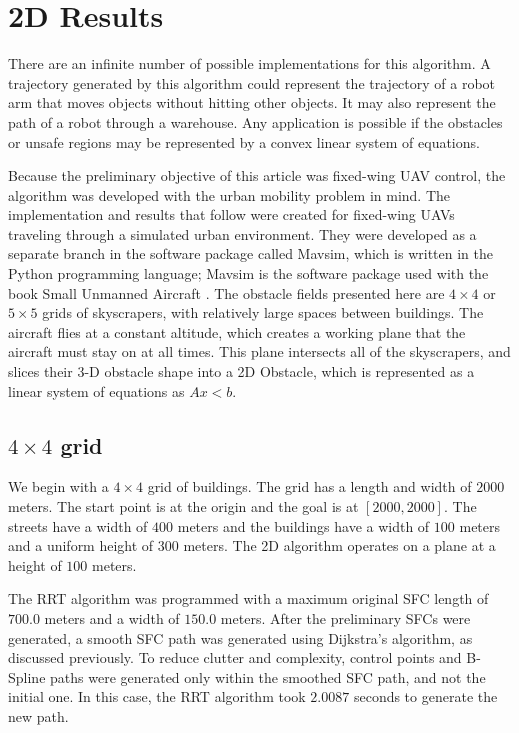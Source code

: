 \section{2D Results}

There are an infinite number of possible implementations for this algorithm. 
A trajectory generated by this algorithm could represent the trajectory of a robot arm that moves objects without hitting other objects. 
It may also represent the path of a robot through a warehouse. 
Any application is possible if the obstacles or unsafe regions may be represented by a convex linear system of equations. 

Because the preliminary objective of this article was fixed-wing UAV control, the algorithm was developed with the urban mobility problem in mind. The implementation and results that follow were created for fixed-wing UAVs traveling through a simulated urban environment. They were developed as a separate branch in the software package called Mavsim, which is written in the Python programming language; Mavsim is the  software package used with the book Small Unmanned Aircraft \cite{uav_book}. The obstacle fields presented here are $4 \times 4$ or $5 \times 5$ grids of skyscrapers, with relatively large spaces between buildings. The aircraft flies at a constant altitude, which creates a working plane that the aircraft must stay on at all times. This plane intersects all of the skyscrapers, and slices their 3-D obstacle shape into a 2D Obstacle, which is represented as a linear system of equations as $Ax<b$.

\subsection{$4 \times 4$ grid}

We begin with a $4 \times 4$ grid of buildings. 
The grid has a length and width of $2000$ meters. 
The start point is at the origin and the goal is at $[2000,2000]$. 
The streets have a width of $400$ meters and the buildings have a width of $100$ meters and a uniform height of $300$ meters. 
The 2D algorithm operates on a plane at a height of $100$ meters.

The RRT algorithm was programmed with a maximum original SFC length of $700.0$ meters and a width of $150.0$ meters. 
After the preliminary SFCs were generated, a smooth SFC path was generated using Dijkstra's algorithm, as discussed previously. 
To reduce clutter and complexity, control points and B-Spline paths were generated only within the smoothed SFC path, and not the initial one. 
In this case, the RRT algorithm took $2.0087$ seconds to generate the new path.

